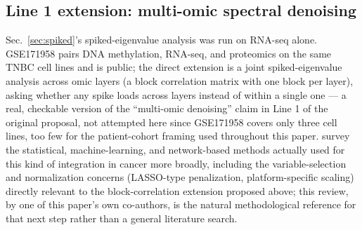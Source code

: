 \documentclass[11pt]{article}
\begin{document}
\subsection{Line 1 extension: multi-omic spectral denoising}
Sec.~\ref{sec:spiked}'s spiked-eigenvalue analysis was run on RNA-seq
alone. GSE171958 \citep{tnbcmultiomics2021} pairs DNA methylation,
RNA-seq, and proteomics on the same TNBC cell lines and is public; the
direct extension is a joint spiked-eigenvalue analysis across omic
layers (a block correlation matrix with one block per layer), asking
whether any spike loads across layers instead of within a single one
--- a real, checkable version of the ``multi-omic denoising'' claim in
Line 1 of the original proposal, not attempted here since GSE171958
covers only three cell lines, too few for the patient-cohort framing
used throughout this paper. \citet{hernandezlemusochoa2024} survey the
statistical, machine-learning, and network-based methods actually used
for this kind of integration in cancer more broadly, including the
variable-selection and normalization concerns (LASSO-type penalization,
platform-specific scaling) directly relevant to the block-correlation
extension proposed above; this review, by one of this paper's own
co-authors, is the natural methodological reference for that next
step rather than a general literature search.
\end{document}
